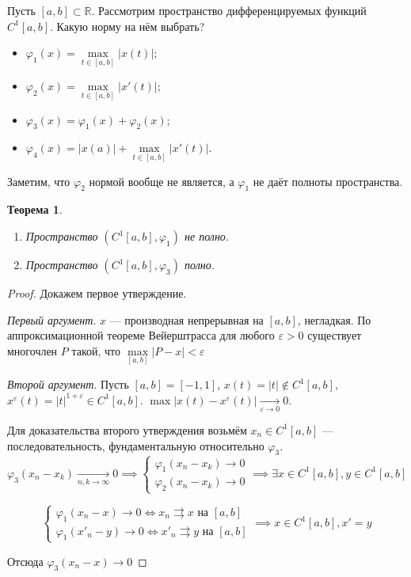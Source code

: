 \documentclass[11pt,openany,a4paper]{scrartcl}
\theoremstyle{plain}
\newtheorem{theorem}{Теорема}[section]
\theoremstyle{definition}
\newcommand\mb{\mathbb}
\newcommand\real{\mb R}
\newcommand{\uto}{\rightrightarrows}
\newcommand{\underto}[1]{\xrightarrow[#1]{}}
\begin{document}
Пусть $[a, b] \subset \real$.
Рассмотрим пространство дифференцируемых функций $C^1[a, b]$.
Какую норму на нём выбрать?
\begin{itemize}
    \item $\varphi_1(x) = \max\limits_{t \in [a, b]} |x(t)|$;
    \item $\varphi_2(x) = \max\limits_{t \in [a, b]} |x'(t)|$;
    \item $\varphi_3(x) = \varphi_1(x) + \varphi_2(x)$;
    \item $\varphi_4(x) = |x(a)| + \max\limits_{t \in [a, b]} |x'(t)|$.
\end{itemize}

Заметим, что $\varphi_2$ нормой вообще не является, а $\varphi_1$ не даёт полноты
пространства.
\pagebreak
\begin{theorem}
    \begin{enumerate}
        \item Пространство $(C^1 [a, b], \varphi_1)$ не полно.
        \item Пространство $(C^1 [a, b], \varphi_3)$ полно.
    \end{enumerate}
\end{theorem}

\begin{proof}
    Докажем первое утверждение.

    \emph{Первый аргумент}. $x$ — производная непрерывная на $[a, b]$, негладкая.
        По аппроксимационной теореме Вейерштрасса для любого $\varepsilon > 0$ существует многочлен
        $P$ такой, что $\max\limits_{[a, b]} |P - x| < \varepsilon$

    \emph{Второй аргумент}. Пусть $[a, b] = [-1, 1]$, $x(t) = |t| \notin C^1[a, b]$,
    $x^\varepsilon(t) = |t|^{1 + \varepsilon} \in C^1[a, b]$. $\max |x(t) - x^\varepsilon(t)| 
    \underto{\varepsilon \to 0} 0$.

    Для доказательства второго утверждения возьмём $x_n \in C^1[a, b]$ —
    последовательность, фундаментальную относительно $\varphi_3$.
    $$
    \varphi_3(x_n -x_k) \underto{n, k \to \infty} 0 \implies
    \begin{cases}
        \varphi_1(x_n - x_k) \to 0\\
        \varphi_2(x_n - x_k) \to 0
    \end{cases}
    \implies \exists x \in C^1[a, b], y \in C^1[a, b]
    $$

    $$
    \begin{cases}
        \varphi_1(x_n - x) \to 0 \iff x_n \uto x \text{ на } [a, b]\\
        \varphi_1(x'_n - y) \to 0 \iff x'_n \uto y \text{ на } [a, b]
    \end{cases}
    \implies x \in C^1[a, b], x' = y
    $$

    Отсюда $\varphi_3(x_n - x) \to 0$
\end{proof}
\end{document}
